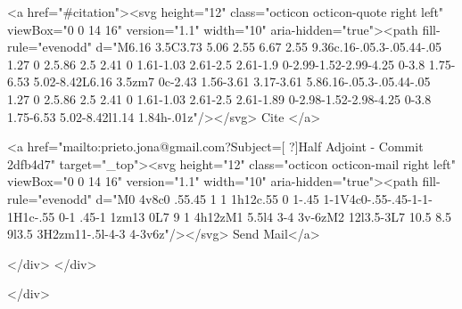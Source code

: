       <a  href="#citation"><svg height="12" class="octicon octicon-quote right left" viewBox="0 0 14 16" version="1.1" width="10" aria-hidden="true"><path fill-rule="evenodd" d="M6.16 3.5C3.73 5.06 2.55 6.67 2.55 9.36c.16-.05.3-.05.44-.05 1.27 0 2.5.86 2.5 2.41 0 1.61-1.03 2.61-2.5 2.61-1.9 0-2.99-1.52-2.99-4.25 0-3.8 1.75-6.53 5.02-8.42L6.16 3.5zm7 0c-2.43 1.56-3.61 3.17-3.61 5.86.16-.05.3-.05.44-.05 1.27 0 2.5.86 2.5 2.41 0 1.61-1.03 2.61-2.5 2.61-1.89 0-2.98-1.52-2.98-4.25 0-3.8 1.75-6.53 5.02-8.42l1.14 1.84h-.01z"/></svg> Cite
      </a>

      <a href="mailto:prieto.jona@gmail.com?Subject=[ ?]Half Adjoint - Commit 2dfb4d7" target="_top"><svg height="12" class="octicon octicon-mail right left" viewBox="0 0 14 16" version="1.1" width="10" aria-hidden="true"><path fill-rule="evenodd" d="M0 4v8c0 .55.45 1 1 1h12c.55 0 1-.45 1-1V4c0-.55-.45-1-1-1H1c-.55 0-1 .45-1 1zm13 0L7 9 1 4h12zM1 5.5l4 3-4 3v-6zM2 12l3.5-3L7 10.5 8.5 9l3.5 3H2zm11-.5l-4-3 4-3v6z"/></svg> Send Mail</a>

    </div>
  </div>

</div>





